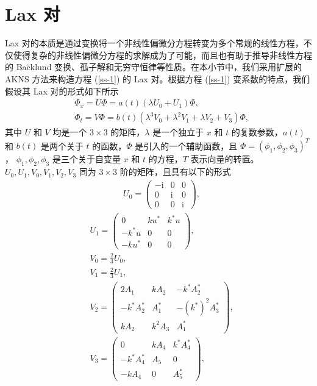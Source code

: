 \section{Lax 对}
Lax 对的本质是通过变换将一个非线性偏微分方程转变为多个常规的线性方程，不仅使得复杂的非线性偏微分方程的求解成为了可能，而且也有助于推导非线性方程的 Ba\"cklund 变换、孤子解和无穷守恒律等性质。在本小节中，我们采用扩展的 AKNS 方法来构造方程 (\ref{ss-1}) 的 Lax 对。根据方程 (\ref{ss-1}) 变系数的特点，我们假设其 Lax 对的形式如下所示
\begin{align}
  & \Phi_{x} = U\Phi = a(t)(\lambda U_{0} + U_{1})\Phi, \label{ss-2}\\
  & \Phi_{t} = V\Phi = b(t)(\lambda^{3}V_{0} + \lambda^{2}V_{1} + \lambda V_{2} + V_{3})\Phi,  \label{ss-3}
\end{align}
其中 $U$ 和 $V$ 均是一个 $3 \times 3$ 的矩阵，$\lambda$ 是一个独立于 $x$ 和 $t$ 的复数参数，$a(t)$ 和 $b(t)$ 是两个关于 $t$ 的函数，$\Phi$ 是引入的一个辅助函数，且 $\Phi = (\phi_1, \phi_2, \phi_3)^T$， $\phi_1, \phi_2, \phi_3$ 是三个关于自变量 $x$ 和 $t$ 的方程，$T$ 表示向量的转置。$U_{0}, U_{1}, V_{0}, V_{1}, V_{2}, V_{3}$ 同为 $3 \times 3$ 阶的矩阵，且具有以下的形式
\begin{align}
  & U_{0} = \begin{pmatrix}
             -\mathrm{i} & 0 & 0 \\
              0 & \mathrm{i} & 0 \\
              0 & 0 & \mathrm{i}
            \end{pmatrix}, \label{ss-lax1}
\end{align}
\begin{align}
  & U_{1} = \begin{pmatrix}
              0 & ku^{*} & k^{*}u \\
              -k^{*}u & 0 & 0 \\
              -ku^{*} & 0 & 0
            \end{pmatrix},  \\
  & V_{0} = \frac{2}{3}U_{0}, \\
  & V_{1} = \frac{2}{3}U_{1}, \\
  & V_{2} = \begin{pmatrix}
              2A_{1} & kA_{2} & -k^{*}A_{2}^{*} \\
              -k^{*}A_{2}^{*} & A_{1}^{*} & -(k^{*})^{2}A_{3}^{*} \\
              kA_{2} & k^{2}A_{3} & A_{1}^{*}
            \end{pmatrix}, \\
  & V_{3} = \begin{pmatrix}
              0 & kA_{4} & k^{*}A_{4}^{*} \\
              -k^{*}A_{4}^{*} & A_{5} & 0 \\
              -kA_{4} & 0 & A_{5}^{*}
            \end{pmatrix}, \label{ss-lax2}
\end{align}
